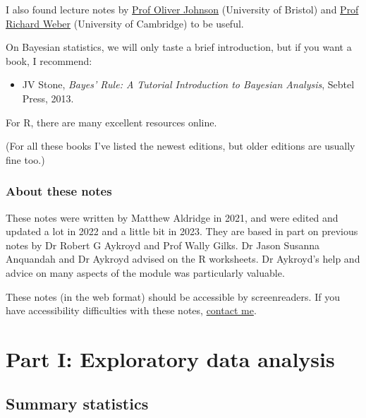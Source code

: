 \documentclass[
  a4paper,
]{book}
\providecommand{\tightlist}{%
  \setlength{\itemsep}{0pt}\setlength{\parskip}{0pt}}
\theoremstyle{definition}
\theoremstyle{definition}
\theoremstyle{definition}
\theoremstyle{definition}
\theoremstyle{remark}
\begin{document}
I also found lecture notes by \href{https://people.maths.bris.ac.uk/~maotj/teaching.html}{Prof Oliver Johnson} (University of Bristol) and \href{http://www.statslab.cam.ac.uk/~rrw1/prob/index.html}{Prof Richard Weber} (University of Cambridge) to be useful.

On Bayesian statistics, we will only taste a brief introduction, but if you want a book, I recommend:

\begin{itemize}
\tightlist
\item
  JV Stone, \emph{Bayes' Rule: A Tutorial Introduction to Bayesian Analysis}, Sebtel Press, 2013.
\end{itemize}

For R, there are many excellent resources online.

(For all these books I've listed the newest editions, but older editions are usually fine too.)

\hypertarget{about-notes}{%
\section*{About these notes}\label{about-notes}}

These notes were written by Matthew Aldridge in 2021, and were edited and updated a lot in 2022 and a little bit in 2023. They are based in part on previous notes by Dr Robert G Aykroyd and Prof Wally Gilks. Dr Jason Susanna Anquandah and Dr Aykroyd advised on the R worksheets. Dr Aykroyd's help and advice on many aspects of the module was particularly valuable.

These notes (in the web format) should be accessible by screenreaders. If you have accessibility difficulties with these notes, \href{mailto:m.aldridge@leeds.ac.uk}{contact me}.

\hypertarget{part-part-i-exploratory-data-analysis}{%
\part*{Part I: Exploratory data analysis}\label{part-part-i-exploratory-data-analysis}}

\hypertarget{L01-stats}{%
\chapter{Summary statistics}\label{L01-stats}}
\end{document}
